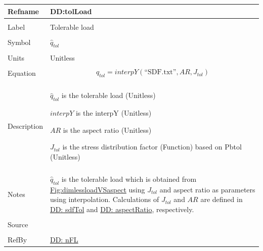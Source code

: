 \documentclass[12pt]{article}
\begin{document}
\noindent \begin{minipage}{\textwidth}
\begin{tabular}{>{\raggedright}p{}>{\raggedright\arraybackslash}p{}}
\toprule \textbf{Refname} & \textbf{DD:tolLoad}
\label{DD:tolLoad}
\\ \midrule \\
Label & Tolerable load
        
\\ \midrule \\
Symbol & ${\hat{q}_{tol}}$
         
\\ \midrule \\
Units & Unitless
        
\\ \midrule \\
Equation & \begin{displaymath}
           {\hat{q}_{tol}}=interpY\left(\text{``SDF.txt''},AR,{J_{tol}}\right)
           \end{displaymath}
\\ \midrule \\
Description & \begin{symbDescription}
              \item{${\hat{q}_{tol}}$ is the tolerable load (Unitless)}
              \item{$interpY$ is the interpY (Unitless)}
              \item{$AR$ is the aspect ratio (Unitless)}
              \item{${J_{tol}}$ is the stress distribution factor (Function) based on Pbtol (Unitless)}
              \end{symbDescription}
\\ \midrule \\
Notes & ${\hat{q}_{tol}}$ is the tolerable load which is obtained from \hyperref[Figure:dimlessloadVSaspect]{Fig:dimlessloadVSaspect} using ${J_{tol}}$ and aspect ratio as parameters using interpolation. Calculations of ${J_{tol}}$ and $AR$ are defined in \hyperref[DD:sdfTol]{DD: sdfTol} and \hyperref[DD:aspectRatio]{DD: aspectRatio}, respectively.
        
\\ \midrule \\
Source & \cite{astm2009}
         
\\ \midrule \\
RefBy & \hyperref[DD:nFL]{DD: nFL}
        
\\ \bottomrule
\end{tabular}
\end{minipage}
\end{document}
